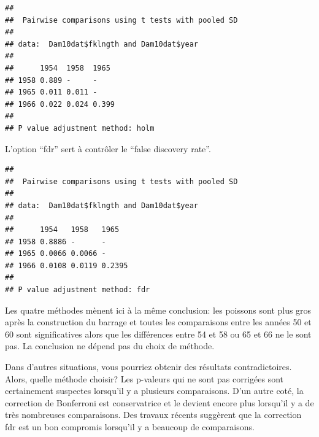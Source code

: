 \documentclass[12pt,]{book}
\newenvironment{Shaded}{\begin{snugshade}}{\end{snugshade}}
\newcommand{\DataTypeTok}[1]{\textcolor[rgb]{0.13,0.29,0.53}{#1}}
\newcommand{\KeywordTok}[1]{\textcolor[rgb]{0.13,0.29,0.53}{\textbf{#1}}}
\newcommand{\NormalTok}[1]{#1}
\newcommand{\OperatorTok}[1]{\textcolor[rgb]{0.81,0.36,0.00}{\textbf{#1}}}
\newcommand{\StringTok}[1]{\textcolor[rgb]{0.31,0.60,0.02}{#1}}
\begin{document}
\begin{Shaded}
\end{Shaded}

\begin{verbatim}
## 
##  Pairwise comparisons using t tests with pooled SD 
## 
## data:  Dam10dat$fklngth and Dam10dat$year 
## 
##      1954  1958  1965 
## 1958 0.889 -     -    
## 1965 0.011 0.011 -    
## 1966 0.022 0.024 0.399
## 
## P value adjustment method: holm
\end{verbatim}

L'option ``fdr'' sert à contrôler le ``false discovery rate''.

\begin{Shaded}
\end{Shaded}

\begin{verbatim}
## 
##  Pairwise comparisons using t tests with pooled SD 
## 
## data:  Dam10dat$fklngth and Dam10dat$year 
## 
##      1954   1958   1965  
## 1958 0.8886 -      -     
## 1965 0.0066 0.0066 -     
## 1966 0.0108 0.0119 0.2395
## 
## P value adjustment method: fdr
\end{verbatim}

Les quatre méthodes mènent ici à la même conclusion: les poissons sont plus gros après la construction du barrage et toutes les comparaisons entre les années 50 et 60 sont significatives alors que les différences entre 54 et 58 ou 65 et 66 ne le sont pas. La conclusion ne dépend pas du choix de méthode.

Dans d'autres situations, vous pourriez obtenir des résultats contradictoires. Alors, quelle méthode choisir? Les p-valeurs qui ne sont pas corrigées sont certainement suspectes lorsqu'il y a plusieurs comparaisons. D'un autre coté, la correction de Bonferroni est conservatrice et le devient encore plus lorsqu'il y a de très nombreuses comparaisons. Des travaux récents suggèrent que la correction fdr est un bon compromis lorsqu'il y a beaucoup de comparaisons.
\end{document}
